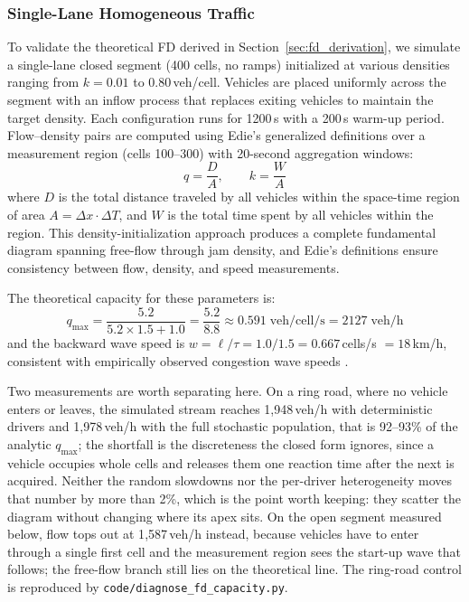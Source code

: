 \documentclass[review,number]{elsarticle}
\begin{document}
\subsubsection{Single-Lane Homogeneous Traffic}

To validate the theoretical FD derived in Section~\ref{sec:fd_derivation}, we simulate a single-lane closed segment (400 cells, no ramps) initialized at various densities ranging from $k = 0.01$ to $0.80$\,veh/cell. Vehicles are placed uniformly across the segment with an inflow process that replaces exiting vehicles to maintain the target density. Each configuration runs for 1200\,s with a 200\,s warm-up period. Flow--density pairs are computed using Edie's generalized definitions \citep{edie1963discussion} over a measurement region (cells 100--300) with 20-second aggregation windows:
\begin{equation}
    q = \frac{D}{A}, \qquad k = \frac{W}{A}
    \label{eq:fd_measurement}
\end{equation}
where $D$ is the total distance traveled by all vehicles within the space-time region of area $A = \Delta x \cdot \Delta T$, and $W$ is the total time spent by all vehicles within the region. This density-initialization approach produces a complete fundamental diagram spanning free-flow through jam density, and Edie's definitions ensure consistency between flow, density, and speed measurements.

The theoretical capacity for these parameters is:
\begin{equation}
    q_{\max} = \frac{5.2}{5.2 \times 1.5 + 1.0} = \frac{5.2}{8.8} \approx 0.591\;\text{veh/cell/s} = 2127\;\text{veh/h}
\end{equation}
and the backward wave speed is $w = \ell/\tau = 1.0/1.5 = 0.667$\,cells/s $= 18$\,km/h, consistent with empirically observed congestion wave speeds \citep{cassidy1998bivariate}.

Two measurements are worth separating here. On a ring road, where no vehicle enters or leaves, the simulated stream reaches 1{,}948\,veh/h with deterministic drivers and 1{,}978\,veh/h with the full stochastic population, that is 92--93\% of the analytic $q_{\max}$; the shortfall is the discreteness the closed form ignores, since a vehicle occupies whole cells and releases them one reaction time after the next is acquired. Neither the random slowdowns nor the per-driver heterogeneity moves that number by more than 2\%, which is the point worth keeping: they scatter the diagram without changing where its apex sits. On the open segment measured below, flow tops out at 1{,}587\,veh/h instead, because vehicles have to enter through a single first cell and the measurement region sees the start-up wave that follows; the free-flow branch still lies on the theoretical line. The ring-road control is reproduced by \texttt{code/diagnose\_fd\_capacity.py}.
\end{document}
